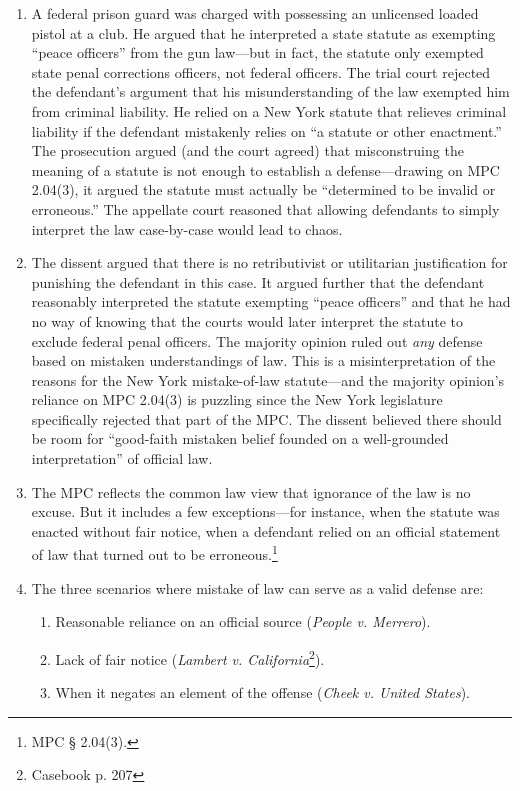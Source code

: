 \begin{enumerate}
    \item A federal prison guard was charged with possessing an unlicensed loaded pistol at a club. He argued that he interpreted a state statute as exempting ``peace officers'' from the gun law---but in fact, the statute only exempted state penal corrections officers, not federal officers. The trial court rejected the defendant's argument that his misunderstanding of the law exempted him from criminal liability. He relied on a New York statute that relieves criminal liability if the defendant mistakenly relies on ``a statute or other enactment.'' The prosecution argued (and the court agreed) that misconstruing the meaning of a statute is not enough to establish a defense---drawing on MPC 2.04(3), it argued the statute must actually be ``determined to be invalid or erroneous.'' The appellate court reasoned that allowing defendants to simply interpret the law case-by-case would lead to chaos.
    \item The dissent argued that there is no retributivist or utilitarian justification for punishing the defendant in this case. It argued further that the defendant reasonably interpreted the statute exempting ``peace officers'' and that he had no way of knowing that the courts would later interpret the statute to exclude federal penal officers. The majority opinion ruled out \emph{any} defense based on mistaken understandings of law. This is a misinterpretation of the reasons for the New York mistake-of-law statute---and the majority opinion's reliance on MPC 2.04(3) is puzzling since the New York legislature specifically rejected that part of the MPC. The dissent believed there should be room for ``good-faith mistaken belief founded on a well-grounded interpretation'' of official law.
    \item The MPC reflects the common law view that ignorance of the law is no excuse. But it includes a few exceptions---for instance, when the statute was enacted without fair notice, when a defendant relied on an official statement of law that turned out to be erroneous.\footnote{MPC § 2.04(3).}
    \item The three scenarios where mistake of law can serve as a valid defense are:
    \begin{enumerate}
        \item Reasonable reliance on an official source (\emph{People v. Merrero}).
        \item Lack of fair notice (\emph{Lambert v. California}\footnote{Casebook p. 207}).
        \item When it negates an element of the offense (\emph{Cheek v. United States}).
    \end{enumerate}
\end{enumerate}

